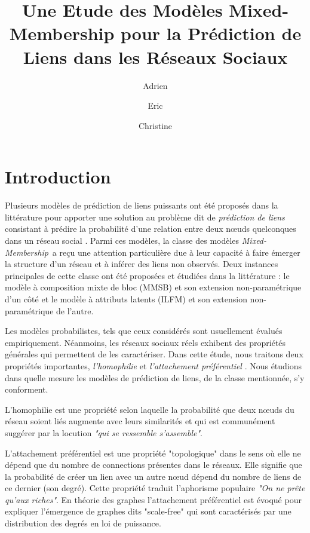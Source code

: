\documentclass[french]{hermes-journal}
\title[]{Une Etude des Modèles Mixed-Membership pour la Prédiction de Liens dans les Réseaux Sociaux}
\author[1]{Adrien}{Dulac}
\author[1]{Eric}{Gaussier}
\author[2]{Christine}{Largeron}
\newcommand{\mmm}{\textit{Mixed-Membership}~}
\begin{document}
\maketitle

\newpage






\section{Introduction}

\label{sec:intro}

Plusieurs modèles de prédiction de liens puissants ont été proposés dans la littérature pour apporter une solution au problème dit de \textit{prédiction de liens} consistant à prédire la probabilité d'une relation entre deux n\oe{}uds quelconques dans un réseau social \cite{LibenNowell07, HassanZaki11}.
Parmi ces modèles, la classe des modèles \mmm a reçu une attention particulière due à leur capacité à faire émerger la structure d'un réseau et à inférer des liens non observés.
Deux instances principales de cette classe ont été proposées et étudiées  dans la littérature : le modèle à composition mixte de bloc (MMSB) \cite{MMSB} et son extension non-paramétrique \cite{iMMSB, fan2015dynamic} d'un côté et le modèle à attributs latents (ILFM) \cite{BMF} et son extension non-paramétrique \cite{ILFRM} de l'autre. 


Les modèles probabilistes, tels que ceux considérés sont usuellement évalués empiriquement. Néanmoins, les réseaux sociaux réels exhibent des propriétés générales qui permettent de les caractériser. Dans cette étude, nous traitons deux propriétés importantes, \textit{l'homophilie} et \textit{l'attachement préférentiel} \cite{ Barabasi2003}. Nous étudions dans quelle mesure les modèles de prédiction de liens, de la classe mentionnée, s'y conforment.

L'homophilie est une propriété selon laquelle la probabilité que deux n\oe{}uds du réseau soient liés augmente avec leurs similarités et qui est communément suggérer par la locution \emph{"qui se ressemble s'assemble"}.

L'attachement préférentiel est une propriété "topologique" dans le sens où elle ne dépend que du nombre de connections présentes dans le réseaux. Elle signifie que la probabilité de créer un lien avec un autre n\oe{}ud dépend du nombre de liens de ce dernier (son degré). Cette propriété traduit l'aphorisme populaire \emph{"On ne prête qu'aux riches"}. En théorie des graphes l'attachement préférentiel est évoqué pour expliquer l'émergence de graphes dits "scale-free" qui sont caractérisés par une distribution des degrés en loi de puissance.
\end{document}
